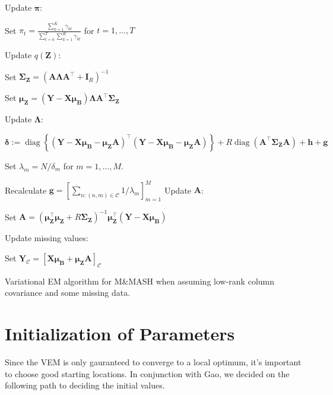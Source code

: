 \documentclass[11pt,authoryear]{article}
\DeclareMathOperator*{\diag}{diag}
\newcommand{\bs}[1]{\boldsymbol{#1}}
\begin{document}
\begin{algorithm}
\begin{algorithmic}
  \STATE Update $\bs{\pi}$:
  \begin{description}
  \item Set $\pi_t = \frac{\sum_{k = 1}^K\gamma_{kt}}{\sum_{t = 0}^T\sum_{k = 1}^K\gamma_{kt}}$ for $t = 1,\ldots, T$
  \end{description}
  \STATE Update $q(\bs{Z})$:
  \begin{description}
  \item Set $\bs{\Sigma}_{\bs{Z}} = \left(\bs{A}\bs{\Lambda}\bs{A}^{\intercal} + \bs{I}_R\right)^{-1}$
  \item Set $\bs{\mu}_{\bs{Z}} = (\bs{Y}-\bs{X}\bs{\mu}_{\bs{B}})\bs{\Lambda} \bs{A}^{\intercal}\bs{\Sigma}_{\bs{Z}}$
  \end{description}
  \STATE Update $\bs{\Lambda}$:
  \begin{description}
  \item $\bs{\delta} := \diag\left\{(\bs{Y}-\bs{X}\bs{\mu}_{\bs{B}} - \bs{\mu}_{\bs{Z}}\bs{A})^{\intercal}(\bs{Y}-\bs{X}\bs{\mu}_{\bs{B}} - \bs{\mu}_{\bs{Z}}\bs{A})\right\} + R\diag(\bs{A}^{\intercal}\bs{\Sigma}_{\bs{Z}}\bs{A}) + \bs{h} + \bs{g}$
  \item Set $\lambda_m = N / \delta_m$ for $m = 1,\ldots,M$.
  \end{description}
  \STATE Recalculate $\bs{g} = \left[\sum_{n: (n, m) \in \mathcal{C}} 1 / \lambda_m\right]_{m = 1}^M$
  \STATE Update $\bs{A}$:
  \begin{description}
  \item Set $\bs{A} = \left(\bs{\mu}_{\bs{Z}}^{\intercal}\bs{\mu}_{\bs{Z}} + R\bs{\Sigma}_{\bs{Z}}\right)^{-1} \bs{\mu}_{\bs{Z}}^{\intercal}(\bs{Y} - \bs{X}\bs{\mu}_{\bs{B}})$
  \end{description}
  \STATE Update missing values:
  \begin{description}
  \item Set $\bs{Y}_{\mathcal{C}} = \left[\bs{X}\bs{\mu}_{\bs{B}} + \bs{\mu}_{\bs{Z}}\bs{A}\right]_{\mathcal{C}}$
  \end{description}
\end{algorithmic}
\caption{Variational EM algorithm for M\&MASH when assuming low-rank column covariance and some missing data.}
\label{algorithm:vem.missing}
\end{algorithm}


\section{Initialization of Parameters}
Since the VEM is only gauranteed to converge to a local optimum, it's
important to choose good starting locations. In conjunction with Gao,
we decided on the following path to deciding the initial values.
\end{document}
